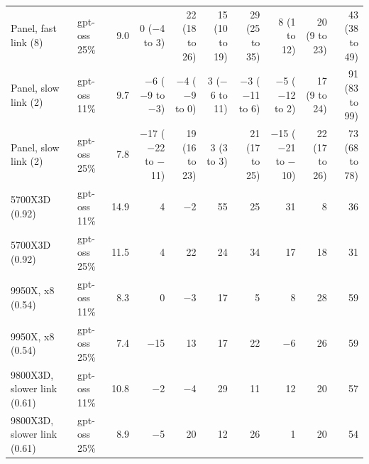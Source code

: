 \begin{table}[t]
{\begin{tabular}{llrrrrrrrr}
Panel, fast link (8) & gpt-oss 25\% & 9.0 & 0 {\scriptsize($-$4 to 3)} & 22 {\scriptsize(18 to 26)} & 15 {\scriptsize(10 to 19)} & 29 {\scriptsize(25 to 35)} & 8 {\scriptsize(1 to 12)} & 20 {\scriptsize(9 to 23)} & 43 {\scriptsize(38 to 49)} \\
Panel, slow link (2) & gpt-oss 11\% & 9.7 & $-$6 {\scriptsize($-$9 to $-$3)} & $-$4 {\scriptsize($-$9 to 0)} & 3 {\scriptsize($-$6 to 11)} & $-$3 {\scriptsize($-$11 to 6)} & $-$5 {\scriptsize($-$12 to 2)} & 17 {\scriptsize(9 to 24)} & 91 {\scriptsize(83 to 99)} \\
Panel, slow link (2) & gpt-oss 25\% & 7.8 & $-$17 {\scriptsize($-$22 to $-$11)} & 19 {\scriptsize(16 to 23)} & 3 {\scriptsize(3 to 3)} & 21 {\scriptsize(17 to 25)} & $-$15 {\scriptsize($-$21 to $-$10)} & 22 {\scriptsize(17 to 26)} & 73 {\scriptsize(68 to 78)} \\
\midrule
5700X3D (0.92) & gpt-oss 11\% & 14.9 & 4 & $-$2 & 55 & 25 & 31 & 8 & 36 \\
5700X3D (0.92) & gpt-oss 25\% & 11.5 & 4 & 22 & 24 & 34 & 17 & 18 & 31 \\
9950X, x8 (0.54) & gpt-oss 11\% & 8.3 & 0 & $-$3 & 17 & 5 & 8 & 28 & 59 \\
9950X, x8 (0.54) & gpt-oss 25\% & 7.4 & $-$15 & 13 & 17 & 22 & $-$6 & 26 & 59 \\
9800X3D, slower link (0.61) & gpt-oss 11\% & 10.8 & $-$2 & $-$4 & 29 & 11 & 12 & 20 & 57 \\
9800X3D, slower link (0.61) & gpt-oss 25\% & 8.9 & $-$5 & 20 & 12 & 26 & 1 & 20 & 54 \\
\bottomrule\end{tabular}}\end{table}
